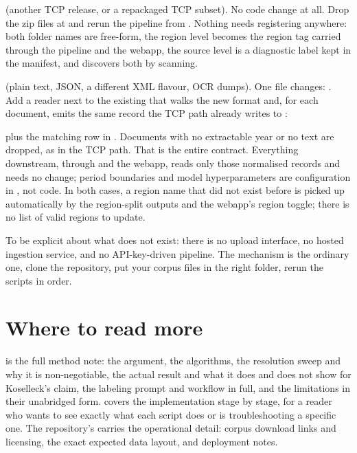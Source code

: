 \documentclass[11pt]{article}
\begin{document}
 (another
TCP release, or a repackaged TCP subset). No code change at all. Drop the
zip files at
and rerun the pipeline from . Nothing needs
registering anywhere: both folder names are free-form, the region level
becomes the region tag carried through the pipeline and the webapp, the
source level is a diagnostic label kept in the manifest, and
 discovers both by scanning.

 (plain text,
JSON, a different XML flavour, OCR dumps). One file changes:
. Add a reader next to the existing
 that walks the new format and, for each
document, emits the same record the TCP path already writes to
:

\begin{dobox}
\end{dobox}

plus the matching  row in
. Documents with no extractable year or no text are
dropped, as in the TCP path. That is the entire contract. Everything
downstream,  through  and the
webapp, reads only those normalised records and needs no change; period
boundaries and model hyperparameters are configuration in
, not code. In both cases, a region name that did not
exist before is picked up automatically by the region-split outputs and
the webapp's region toggle; there is no list of valid regions to update.

To be explicit about what does not exist: there is no upload interface,
no hosted ingestion service, and no API-key-driven pipeline. The
mechanism is the ordinary one, clone the repository, put your corpus
files in the right folder, rerun the scripts in order.

\section{Where to read more}

 is the full method note: the argument, the
algorithms, the resolution sweep and why it is non-negotiable, the
actual result and what it does and does not show for Koselleck's
claim, the labeling prompt and workflow in full, and the limitations
in their unabridged form.  covers the
implementation stage by stage, for a reader who wants to see exactly
what each script does or is troubleshooting a specific one. The
repository's  carries the operational detail: corpus
download links and licensing, the exact expected data layout, and
deployment notes.
\end{document}
